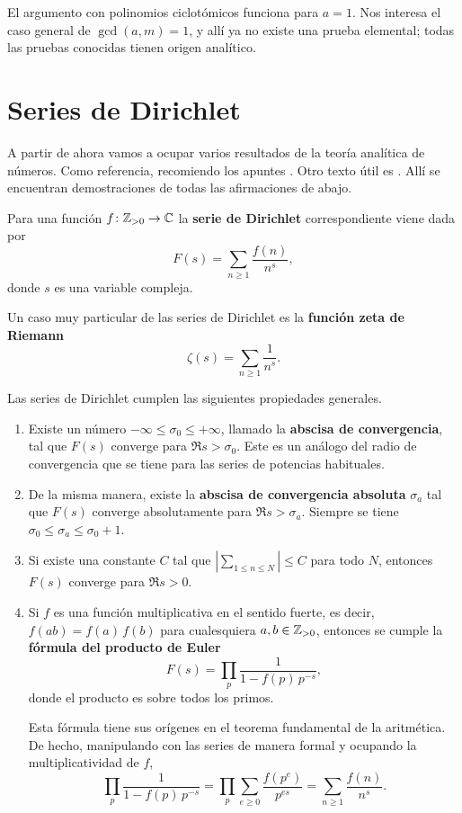 El argumento con polinomios ciclotómicos funciona para $a = 1$. Nos interesa
el caso general de $\gcd (a,m)=1$, y allí ya no existe una prueba elemental;
todas las pruebas conocidas tienen origen analítico.


\section{Series de Dirichlet}

A partir de ahora vamos a ocupar varios resultados de la teoría analítica de
números. Como referencia, recomiendo los apuntes \cite{Everiste-ANT}. Otro texto
útil es \cite{Hlawka-Taschner-Schoissengeier}. Allí se encuentran demostraciones
de todas las afirmaciones de abajo.

\begin{definicion}
  Para una función $f\colon \mathbb{Z}_{>0} \to \mathbb{C}$ la \textbf{serie de Dirichlet}
  correspondiente viene dada por
  $$F (s) = \sum_{n\ge 1} \frac{f(n)}{n^s},$$
  donde $s$ es una variable compleja.
\end{definicion}

Un caso muy particular de las series de Dirichlet es la
\textbf{función zeta de Riemann}
$$\zeta (s) = \sum_{n\ge 1} \frac{1}{n^s}.$$

Las series de Dirichlet cumplen las siguientes propiedades generales.

\begin{enumerate}
\item Existe un número $-\infty \le \sigma_0 \le +\infty$, llamado
  la \textbf{abscisa de convergencia}, tal que $F (s)$ converge para
  $\Re s > \sigma_0$. Este es un análogo del radio de convergencia que se tiene
  para las series de potencias habituales.

\item De la misma manera, existe la \textbf{abscisa de convergencia absoluta}
  $\sigma_a$ tal que $F (s)$ converge absolutamente para $\Re s > \sigma_a$.
  Siempre se tiene $\sigma_0 \le \sigma_a \le \sigma_0 + 1$.

\item Si existe una constante $C$ tal que
  $\left|\sum_{1 \le n\le N}\right| \le C$ para todo $N$, entonces $F (s)$
  converge para $\Re s > 0$.

\item Si $f$ es una función multiplicativa en el sentido fuerte, es decir,
  $f (ab) = f (a)\,f (b)$ para cualesquiera $a, b \in \mathbb{Z}_{> 0}$, entonces se
  cumple la \textbf{fórmula del producto de Euler}
  $$F (s) = \prod_p \frac{1}{1 - f (p)\,p^{-s}},$$
  donde el producto es sobre todos los primos.

  Esta fórmula tiene sus orígenes en el teorema fundamental de la aritmética.
  De hecho, manipulando con las series de manera formal y ocupando
  la multiplicatividad de $f$,
  \[ \prod_p \frac{1}{1 - f (p)\,p^{-s}} =
     \prod_p \sum_{e \ge 0} \frac{f (p^e)}{p^{es}} =
     \sum_{n\ge 1} \frac{f (n)}{n^s}. \]
\end{enumerate}


